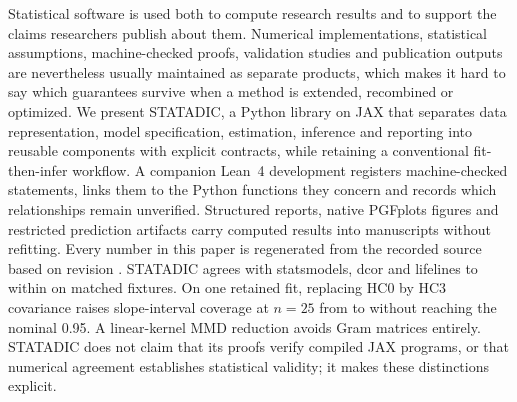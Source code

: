 Statistical software is used both to compute research results and to support
the claims researchers publish about them. Numerical implementations,
statistical assumptions, machine-checked proofs, validation studies and
publication outputs are nevertheless usually maintained as separate products,
which makes it hard to say which guarantees survive when a method is extended,
recombined or optimized. We present STATADIC, a Python library on JAX that
separates data representation, model specification, estimation, inference and
reporting into reusable components with explicit contracts, while retaining a
conventional fit-then-infer workflow. A companion Lean~4 development registers
machine-checked statements, links them to the Python functions they concern
and records which relationships remain unverified. Structured reports, native
PGFplots figures and restricted prediction artifacts carry computed results
into manuscripts without refitting. Every number in this paper is regenerated
from the recorded source based on revision
\texttt{}. STATADIC agrees with statsmodels, dcor
and lifelines to within  on matched fixtures. On one
retained fit, replacing HC0 by HC3 covariance raises slope-interval coverage at
$n = 25$ from  to  without
reaching the nominal 0.95. A linear-kernel MMD reduction avoids Gram matrices
entirely. STATADIC does not claim that its proofs verify compiled JAX programs, or
that numerical agreement establishes statistical validity; it makes these
distinctions explicit.
